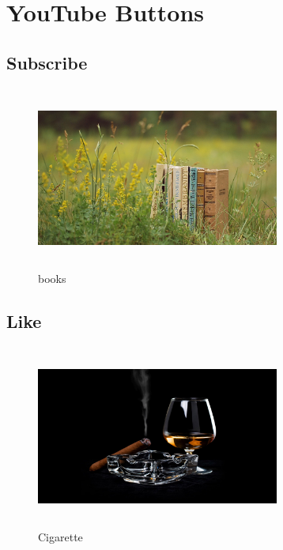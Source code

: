 \chapter{YouTube Buttons}

\section{Subscribe}
\begin{figure}[h!]
    \centering
    \includegraphics[width= 8cm, height = 6cm]{images/2lgiv4.jpg}
    \caption{books}
    \label{fig1}
\end{figure}


\section{Like}
\begin{figure}[ht]
    \centering
    \includegraphics[width= 8cm, height = 6cm]{images/3zZ0vU.jpg}
    \caption{Cigarette}
    \label{fig2}
\end{figure}